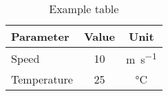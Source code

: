 \begin{table}[h!]
    \centering
    \begin{tabular}{l c c}
        \toprule
        Parameter & Value & Unit \\
        \midrule
        Speed & 10 & \si{\meter\per\second} \\
        Temperature & 25 & \si{\celsius} \\
        \bottomrule
    \end{tabular}
    \caption{Example table}
\end{table}
